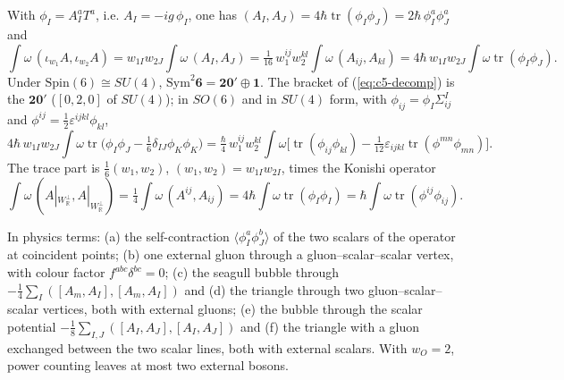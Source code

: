\begin{remark}
With $\phi_I=A^a_IT^a$, i.e. $A_I=-ig\,\phi_I$, one has $(A_I,A_J)=4\hbar\operatorname{tr}(\phi_I\phi_J)=2\hbar\,\phi^a_I\phi^a_J$ and
\[
\int\omega\,(\iota_{w_1}A,\iota_{w_2}A)=w_{1I}w_{2J}\int\omega\,(A_I,A_J)=\tfrac1{16}\,w_1^{ij}w_2^{kl}\int\omega\,(A_{ij},A_{kl})=4\hbar\,w_{1I}w_{2J}\int\omega\operatorname{tr}(\phi_I\phi_J).
\]
Under $\mathrm{Spin}(6)\cong SU(4)$, $\mathrm{Sym}^2\mathbf 6=\mathbf{20'}\oplus\mathbf 1$. The bracket of (\ref{eq:c5-decomp}) is the $\mathbf{20'}$ ($[0,2,0]$ of $SU(4)$); in $SO(6)$ and in $SU(4)$ form, with $\phi_{ij}=\phi_I\Sigma^I_{ij}$ and $\phi^{ij}=\tfrac12\varepsilon^{ijkl}\phi_{kl}$,
\[
4\hbar\,w_{1I}w_{2J}\int\omega\operatorname{tr}\big(\phi_I\phi_J-\tfrac16\delta_{IJ}\phi_K\phi_K\big)=\tfrac\hbar4\,w_1^{ij}w_2^{kl}\int\omega\Big[\operatorname{tr}(\phi_{ij}\phi_{kl})-\tfrac1{12}\varepsilon_{ijkl}\operatorname{tr}(\phi^{mn}\phi_{mn})\Big].
\]
The trace part is $\tfrac16(w_1,w_2)$, $(w_1,w_2)=w_{1I}w_{2I}$, times the Konishi operator
\[
\int\omega\,(A|_{W_{\mathbb R}^\perp},A|_{W_{\mathbb R}^\perp})=\tfrac14\int\omega\,(A^{ij},A_{ij})=4\hbar\int\omega\operatorname{tr}(\phi_I\phi_I)=\hbar\int\omega\operatorname{tr}(\phi^{ij}\phi_{ij}).
\]
\end{remark}

\begin{remark}
In physics terms: (a) the self-contraction $\langle\phi^a_I\phi^b_J\rangle$ of the two scalars of the operator at coincident points; (b) one external gluon through a gluon--scalar--scalar vertex, with colour factor $f^{abc}\delta^{bc}=0$; (c) the seagull bubble through $-\tfrac14\sum_I([A_m,A_I],[A_m,A_I])$ and (d) the triangle through two gluon--scalar--scalar vertices, both with external gluons; (e) the bubble through the scalar potential $-\tfrac18\sum_{I,J}([A_I,A_J],[A_I,A_J])$ and (f) the triangle with a gluon exchanged between the two scalar lines, both with external scalars. With $w_O=2$, power counting leaves at most two external bosons.
\end{remark}

